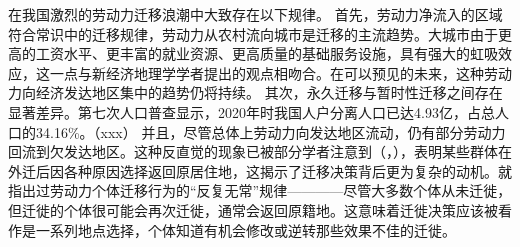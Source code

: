 \documentclass[
  a4paper,
  zihao=-4,
  fontset=mac,
  AutoFakeBold,
  AutoFakeSlant,
  oneside]{ctexbook}
\begin{document}
在我国激烈的劳动力迁移浪潮中大致存在以下规律。
首先，劳动力净流入的区域符合常识中的迁移规律，劳动力从农村流向城市是迁移的主流趋势。大城市由于更高的工资水平、更丰富的就业资源、更高质量的基础服务设施，具有强大的虹吸效应，这一点与新经济地理学学者提出的观点相吻合。在可以预见的未来，这种劳动力向经济发达地区集中的趋势仍将持续。
其次，永久迁移与暂时性迁移之间存在显著差异。第七次人口普查显示，2020年时我国人户分离人口已达4.93亿，占总人口的34.16\%。（xxx）
并且，尽管总体上劳动力向发达地区流动，仍有部分劳动力回流到欠发达地区。这种反直觉的现象已被部分学者注意到（\textcite{ShiZhiLeiJiaTingBingFuJiaTingJueCeYuNongCunQianYiLaoDongLiHuiLiu2012}，\textcite{RenYuanNongCunWaiChuLaoDongLiHuiLiuQianYiDeYingXiangYinSuHeHuiLiuXiaoYing2017}），表明某些群体在外迁后因各种原因选择返回原居住地，这揭示了迁移决策背后更为复杂的动机。\textcite{davanzoRepeatMigrationUnited1983}就指出过劳动力个体迁移行为的“反复无常”规律————尽管大多数个体从未迁徙，但迁徙的个体很可能会再次迁徙，通常会返回原籍地。这意味着迁徙决策应该被看作是一系列地点选择，个体知道有机会修改或逆转那些效果不佳的迁徙。
\end{document}
